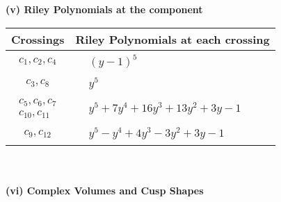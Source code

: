 \documentclass[1p]{elsarticle_modified}
\theoremstyle{definition}
\begin{document}
\newpage\renewcommand{\arraystretch}{1}
\flushleft \textbf{(v) Riley Polynomials at the component}\newline \\
\begin{tabular}{m{50pt}|m{274pt}}
Crossings & \hspace{64pt}Riley Polynomials at each crossing \\
\hline $$\begin{aligned}c_{1},c_{2},c_{4}\end{aligned}$$&$\begin{aligned}
&(y-1)^5
\end{aligned}$\\
\hline $$\begin{aligned}c_{3},c_{8}\end{aligned}$$&$\begin{aligned}
&y^5
\end{aligned}$\\
\hline $$\begin{aligned}c_{5},c_{6},c_{7}\\c_{10},c_{11}\end{aligned}$$&$\begin{aligned}
&y^5+7 y^4+16 y^3+13 y^2+3 y-1
\end{aligned}$\\
\hline $$\begin{aligned}c_{9},c_{12}\end{aligned}$$&$\begin{aligned}
&y^5- y^4+4 y^3-3 y^2+3 y-1
\end{aligned}$\\
\hline
\end{tabular}\\~\\
\newpage\flushleft \textbf{(vi) Complex Volumes and Cusp Shapes}
\end{document}
